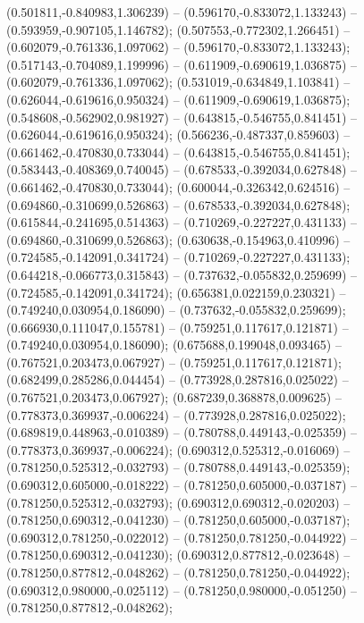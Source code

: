 (0.501811,-0.840983,1.306239) -- (0.596170,-0.833072,1.133243) -- (0.593959,-0.907105,1.146782);
 (0.507553,-0.772302,1.266451) -- (0.602079,-0.761336,1.097062) -- (0.596170,-0.833072,1.133243);
 (0.517143,-0.704089,1.199996) -- (0.611909,-0.690619,1.036875) -- (0.602079,-0.761336,1.097062);
 (0.531019,-0.634849,1.103841) -- (0.626044,-0.619616,0.950324) -- (0.611909,-0.690619,1.036875);
 (0.548608,-0.562902,0.981927) -- (0.643815,-0.546755,0.841451) -- (0.626044,-0.619616,0.950324);
 (0.566236,-0.487337,0.859603) -- (0.661462,-0.470830,0.733044) -- (0.643815,-0.546755,0.841451);
 (0.583443,-0.408369,0.740045) -- (0.678533,-0.392034,0.627848) -- (0.661462,-0.470830,0.733044);
 (0.600044,-0.326342,0.624516) -- (0.694860,-0.310699,0.526863) -- (0.678533,-0.392034,0.627848);
 (0.615844,-0.241695,0.514363) -- (0.710269,-0.227227,0.431133) -- (0.694860,-0.310699,0.526863);
 (0.630638,-0.154963,0.410996) -- (0.724585,-0.142091,0.341724) -- (0.710269,-0.227227,0.431133);
 (0.644218,-0.066773,0.315843) -- (0.737632,-0.055832,0.259699) -- (0.724585,-0.142091,0.341724);
 (0.656381,0.022159,0.230321) -- (0.749240,0.030954,0.186090) -- (0.737632,-0.055832,0.259699);
 (0.666930,0.111047,0.155781) -- (0.759251,0.117617,0.121871) -- (0.749240,0.030954,0.186090);
 (0.675688,0.199048,0.093465) -- (0.767521,0.203473,0.067927) -- (0.759251,0.117617,0.121871);
 (0.682499,0.285286,0.044454) -- (0.773928,0.287816,0.025022) -- (0.767521,0.203473,0.067927);
 (0.687239,0.368878,0.009625) -- (0.778373,0.369937,-0.006224) -- (0.773928,0.287816,0.025022);
 (0.689819,0.448963,-0.010389) -- (0.780788,0.449143,-0.025359) -- (0.778373,0.369937,-0.006224);
 (0.690312,0.525312,-0.016069) -- (0.781250,0.525312,-0.032793) -- (0.780788,0.449143,-0.025359);
 (0.690312,0.605000,-0.018222) -- (0.781250,0.605000,-0.037187) -- (0.781250,0.525312,-0.032793);
 (0.690312,0.690312,-0.020203) -- (0.781250,0.690312,-0.041230) -- (0.781250,0.605000,-0.037187);
 (0.690312,0.781250,-0.022012) -- (0.781250,0.781250,-0.044922) -- (0.781250,0.690312,-0.041230);
 (0.690312,0.877812,-0.023648) -- (0.781250,0.877812,-0.048262) -- (0.781250,0.781250,-0.044922);
 (0.690312,0.980000,-0.025112) -- (0.781250,0.980000,-0.051250) -- (0.781250,0.877812,-0.048262);
